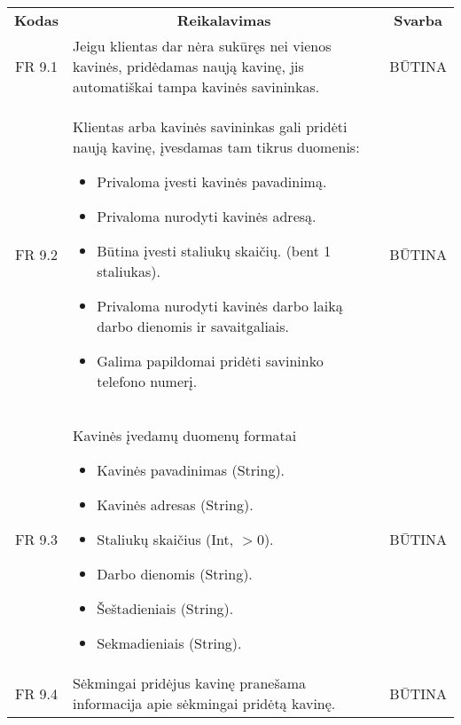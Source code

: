 \documentclass{VUMIFPSkursinis}
\begin{document}
\begin{center}
	\begin{table}[H]
	\begin{tabular}{|p{2cm}|p{}|p{}|}
	
	\hline
	    \rowcolor{lightgray}
		\multicolumn{3}{|c|}{Kavinės pridėjimas}\\
		
	\hline
		\multicolumn{1}{|c|}{{\bfseries Kodas}}&
		\multicolumn{1}{|c|}{{\bfseries Reikalavimas}}&
		\multicolumn{1}{|c|}{{\bfseries Svarba}}\\

	\hline
		\multicolumn{1}{|c|}{FR 9.1}&
		{Jeigu klientas dar nėra sukūręs nei vienos kavinės, pridėdamas naują kavinę, jis automatiškai tampa kavinės savininkas.}&
		\multicolumn{1}{|c|}{BŪTINA}\\	

	\hline
		\multicolumn{1}{|c|}{FR 9.2}&
		{Klientas arba kavinės savininkas gali pridėti naują kavinę, įvesdamas tam tikrus duomenis:
			\begin{itemize}
				\item Privaloma įvesti kavinės pavadinimą.
				\item Privaloma nurodyti kavinės adresą.
				\item Būtina įvesti staliukų skaičių. (bent 1 staliukas).
				\item Privaloma nurodyti kavinės darbo laiką darbo dienomis ir savaitgaliais.
				\item Galima papildomai pridėti savininko telefono numerį.
			\end{itemize}}&
		\multicolumn{1}{|c|}{BŪTINA}\\	

	\hline
		\multicolumn{1}{|c|}{FR 9.3}&
		{Kavinės įvedamų duomenų formatai
			\begin{itemize}
				\item Kavinės pavadinimas (String).
				\item Kavinės adresas (String).
				\item Staliukų skaičius (Int, $>$0).
				\item Darbo dienomis (String).
				\item Šeštadieniais (String).
				\item Sekmadieniais (String).
			\end{itemize}}&
		\multicolumn{1}{|c|}{BŪTINA}\\	

	\hline
		\multicolumn{1}{|c|}{FR 9.4}&
		{Sėkmingai pridėjus kavinę pranešama informacija apie sėkmingai pridėtą kavinę.}&
		\multicolumn{1}{|c|}{BŪTINA}\\	


\end{tabular}
\end{table}
\end{center}
\end{document}
